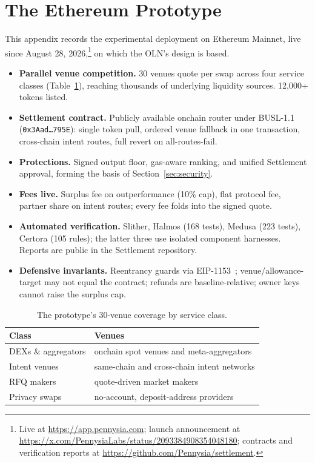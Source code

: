 \section{The Ethereum Prototype}\label{app:v1}

This appendix records the experimental deployment on Ethereum Mainnet, live since August 28, 2026,\footnote{Live at \url{https://app.pennysia.com}; launch announcement at \url{https://x.com/PennysiaLabs/status/2093384908354048180}; contracts and verification reports at \url{https://github.com/Pennysia/settlement}.} on which the OLN's design is based.

\begin{itemize}[leftmargin=1.5em]
  \item \textbf{Parallel venue competition.} 30 venues quote per swap across four service classes (Table~\ref{tab:venues}), reaching thousands of underlying liquidity sources. 12,000+ tokens listed.
  \item \textbf{Settlement contract.} Publicly available onchain router under BUSL-1.1 (\texttt{0x3Aad\ldots795E}): single token pull, ordered venue fallback in one transaction, cross-chain intent routes, full revert on all-routes-fail.
  \item \textbf{Protections.} Signed output floor, gas-aware ranking, and unified Settlement approval, forming the basis of Section~\ref{sec:security}.
  \item \textbf{Fees live.} Surplus fee on outperformance (10\% cap), flat protocol fee, partner share on intent routes; every fee folds into the signed quote.
  \item \textbf{Automated verification.} Slither, Halmos (168 tests), Medusa (223 tests), Certora (105 rules); the latter three use isolated component harnesses. Reports are public in the Settlement repository.
  \item \textbf{Defensive invariants.} Reentrancy guards via EIP-1153~\cite{eip1153}; venue/allowance-target may not equal the contract; refunds are baseline-relative; owner keys cannot raise the surplus cap.
\end{itemize}

\begin{table}[ht]
\centering\small
\caption{The prototype's 30-venue coverage by service class.}
\label{tab:venues}
\begin{tabular}{@{}ll@{}}
\toprule
\textbf{Class} & \textbf{Venues} \\
\midrule
DEXs \& aggregators & onchain spot venues and meta-aggregators \\
Intent venues & same-chain and cross-chain intent networks \\
RFQ makers & quote-driven market makers \\
Privacy swaps & no-account, deposit-address providers \\
\bottomrule
\end{tabular}
\end{table}
